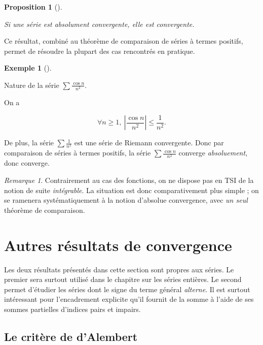 \documentclass[
  french,
  letterpaper,
  DIV=11,
  numbers=noendperiod]{scrreprt}
\theoremstyle{plain}
\theoremstyle{definition}
\theoremstyle{plain}
\newtheorem{proposition}{Proposition}[chapter]
\theoremstyle{plain}
\theoremstyle{definition}
\theoremstyle{definition}
\newtheorem{example}{Exemple}[chapter]
\theoremstyle{plain}
\theoremstyle{remark}
\newtheorem{refremark}{Remarque}[chapter]
\begin{document}
\begin{proposition}[]\protect\hypertarget{prp-absolue-convergence}{}\label{prp-absolue-convergence}

Si une série est absolument convergente, elle est convergente.

\end{proposition}

Ce résultat, combiné au théorème de comparaison de séries à termes
positifs, permet de résoudre la plupart des cas rencontrés en pratique.

\begin{example}[]\protect\hypertarget{exm-abolue-convergence}{}\label{exm-abolue-convergence}

Nature de la série \(\sum \frac{\cos n}{n^{2}}\).

On a

\[
    \forall n \geqslant 1,\ \left|\frac{\cos n}{n^{2}}\right| \leqslant
\frac{1}{n^{2}}.
\]

De plus, la série \(\sum \frac{1}{n^{2}}\) est une série de Riemann
convergente. Donc par comparaison de séries à termes positifs, la série
\(\sum \frac{\cos
n}{n^{2}}\) converge \emph{absoluement}, donc converge.

\end{example}

\begin{refremark}
Contrairement au cas des fonctions, on ne dispose pas en TSI de la
notion de suite \emph{intégrable}. La situation est donc comparativement
plus simple ; on se ramenera systématiquement à la notion d'absolue
convergence, avec \emph{un seul} théorème de comparaison.

\label{rem-integrable}

\end{refremark}

\section{Autres résultats de convergence}\label{sec-02-autre}

Les deux résultats présentés dans cette section sont propres aux séries.
Le premier sera surtout utilisé dans le chapitre sur les séries
entières. Le second permet d'étudier les séries dont le signe du terme
général \emph{alterne}. Il est surtout intéressant pour l'encadrement
explicite qu'il fournit de la somme à l'aide de ses sommes partielles
d'indices pairs et impairs.

\subsection{Le critère de d'Alembert}\label{le-crituxe8re-de-dalembert}
\end{document}
